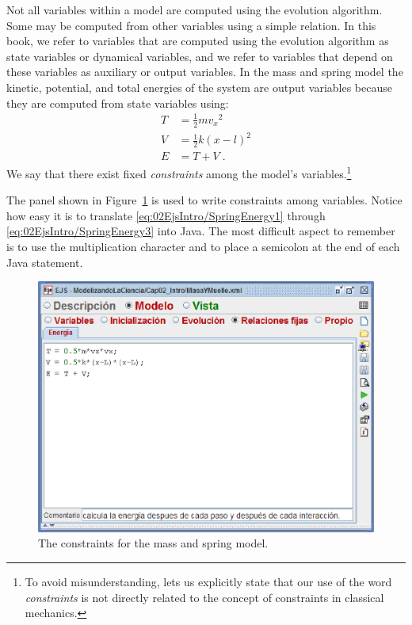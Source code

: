 Not all variables within a model are computed using the evolution algorithm. Some may be computed from other variables
using a simple relation. In this book, we refer to variables that are computed using the evolution algorithm as state variables or
dynamical variables, and we refer to variables that depend on these variables as auxiliary or output variables. In the mass and
spring model the kinetic, potential, and total energies of the system are output variables because they are computed
from state variables using:
\begin{align}
  T &= \frac{1}{2} m {v_x}^2              \label{eq:02EjsIntro/SpringEnergy1} \\
  V &= \frac{1}{2} k (x-l)^2    \label{eq:02EjsIntro/SpringEnergy2} \\
  E &= T + V  \;.                            \label{eq:02EjsIntro/SpringEnergy3}
\end{align}
We  say that there exist fixed \emph{constraints} among the
model's variables.\footnote{To avoid misunderstanding, lets us explicitly state that our use of the word
\emph{constraints} is not directly related to the concept of constraints in classical mechanics.}

The  panel shown in Figure~\ref{fig:02EjsIntro/ModelConstraints} is used to write constraints among
variables. Notice how easy it is to translate \eqref{eq:02EjsIntro/SpringEnergy1} through
\eqref{eq:02EjsIntro/SpringEnergy3} into Java. The most difficult aspect to remember is  to
use the multiplication character \lit{*} and to place a semicolon at the end of each Java statement.

\begin{figure}[htb]
    \centering
  \includegraphics[scale=\scale]{02EjsIntro/images/ModelConstraints.eps}
    \caption{The constraints for the mass and spring model.}
    \label{fig:02EjsIntro/ModelConstraints}
\end{figure}

